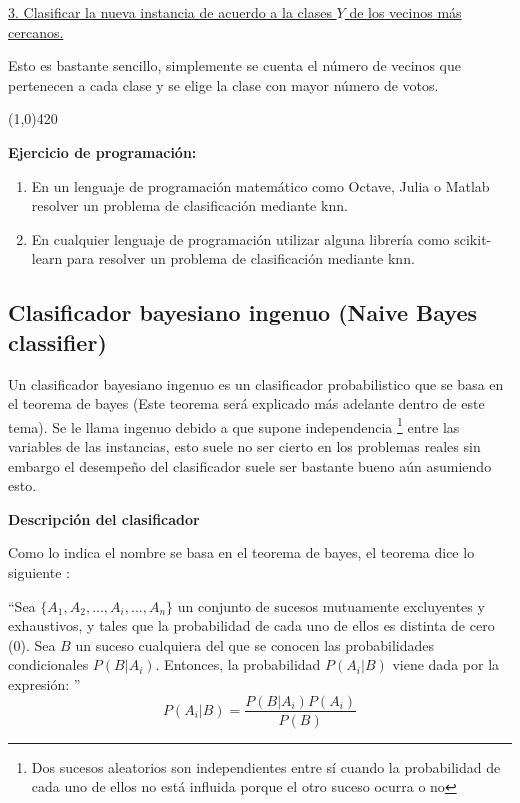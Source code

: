 \documentclass[11pt,fleqn]{book} %
\begin{document}
\underline{3. Clasificar la nueva instancia de acuerdo a la clases $Y$ de los vecinos más cercanos.}

Esto es bastante sencillo, simplemente se cuenta el número de vecinos que pertenecen a cada clase y se elige la clase con mayor número de votos.

\begin{center}
\line(1,0){420}
\end{center}

\textbf{Ejercicio de programación:}

\begin{enumerate}
\item En un lenguaje de programación matemático como Octave, Julia o Matlab resolver un problema de clasificación mediante knn.
\item En cualquier lenguaje de programación utilizar alguna librería como scikit-learn para resolver un problema de clasificación mediante knn.
\end{enumerate}

\subsection{Clasificador bayesiano ingenuo (Naive Bayes classifier)} 

Un clasificador bayesiano ingenuo es un clasificador probabilistico que se basa en el teorema de bayes (Este teorema será explicado más adelante dentro de este tema). Se le llama ingenuo debido a que supone independencia \footnote{Dos sucesos aleatorios son independientes entre sí cuando la probabilidad de cada uno de ellos no está influida porque el otro suceso ocurra o no} entre las variables de las instancias, esto suele no ser cierto en los problemas reales sin embargo el desempeño del clasificador suele ser bastante bueno aún asumiendo esto.

\textbf{Descripción del clasificador}

Como lo indica el nombre se basa en el teorema de bayes, el teorema dice lo siguiente \cite{bayes1958essay}:

 ``Sea $\{A_{1},A_{2},...,A_{i},...,A_{n}\}$ un conjunto de sucesos mutuamente excluyentes y exhaustivos, y tales que la probabilidad de cada uno de ellos es distinta de cero (0). Sea $B$ un suceso cualquiera del que se conocen las probabilidades condicionales $P(B|A_{i})$. Entonces, la probabilidad $P(A_{i}|B)$ viene dada por la expresión: ''
\begin{equation}
P(A_{i}|B) = \frac{P(B|A_{i}) P(A_{i})}{P(B)}
\label{eqn:bayes_theorem} 
\end{equation}
\end{document}
